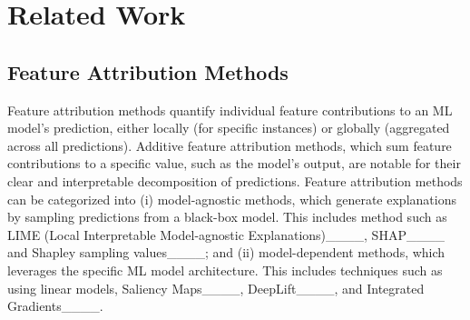 \section{Related Work}
\subsection{Feature Attribution Methods}

Feature attribution methods quantify individual feature contributions to an ML model’s prediction, either locally (for specific instances) or globally (aggregated across all predictions). Additive feature attribution methods, which sum feature contributions to a specific value, such as the model’s output, are notable for their clear and interpretable decomposition of predictions.
Feature attribution methods can be categorized into (i) model-agnostic methods, which generate explanations by sampling predictions from a black-box model. This includes method such as LIME (Local Interpretable Model-agnostic Explanations)____, SHAP____ and Shapley sampling values____; and (ii) model-dependent methods, which leverages the specific ML model architecture. This includes techniques such as using linear models, Saliency Maps____, DeepLift____, and Integrated Gradients____.

